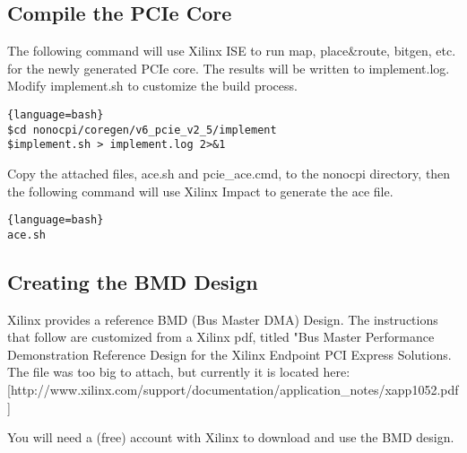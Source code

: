 \subsection{Compile the PCIe Core}

The following command will use Xilinx ISE to run map, place\&route, bitgen, etc. for the newly generated PCIe core.  The results will be written to implement.log.  Modify implement.sh to customize the build process.

\begin{lstlisting}{language=bash}
$cd nonocpi/coregen/v6_pcie_v2_5/implement
$implement.sh > implement.log 2>&1
\end{lstlisting}

Copy the attached files, ace.sh and pcie\_ace.cmd, to the nonocpi directory, then the following command will use Xilinx Impact to generate the ace file.


\begin{lstlisting}{language=bash}
ace.sh
\end{lstlisting}

\subsection{Creating the BMD Design}

Xilinx provides a reference BMD (Bus Master DMA) Design.  The instructions that follow are customized from a Xilinx pdf, titled "Bus Master Performance Demonstration Reference Design for the Xilinx Endpoint PCI Express Solutions.  The file was too big to attach, but currently it is located here:[http://www.xilinx.com/support/documentation/application\_notes/xapp1052.pdf]

You will need a (free) account with Xilinx to download and use the BMD design.


